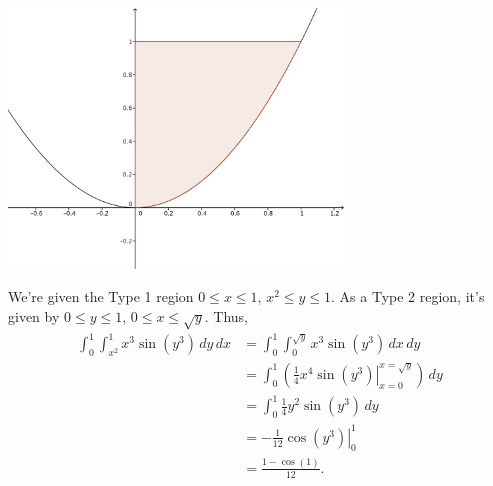 \documentclass[letterpaper,12pt]{article}
\begin{document}
\begin{enumerate}
\begin{enumerate}
\begin{center}
\includegraphics[width=3.5in]{Q11-4d.png} 
\end{center}

We're given the Type 1 region $0\leq x\leq 1$, $x^2\leq y\leq 1$. As a Type 2 region, it's given by $0\leq y\leq 1$, $0\leq x\leq \sqrt{y}$. Thus,
\begin{align*}
 \int_0^1\int_{x^2}^1 x^3\sin(y^3)\,dy\,dx & = \int_0^1\int_0^{\sqrt{y}}x^3\sin(y^3)\,dx\,dy\\
& = \int_0^1\left(\left. \frac{1}{4}x^4\sin(y^3)\right|_{x=0}^{x=\sqrt{y}}\right)\,dy\\
& = \int_0^1\frac{1}{4}y^2\sin(y^3)\,dy\\
& = \left.-\frac{1}{12}\cos(y^3)\right|_0^1\\
& = \frac{1-\cos(1)}{12}.
\end{align*}

 \end{enumerate}



 \end{enumerate}
\end{document}
